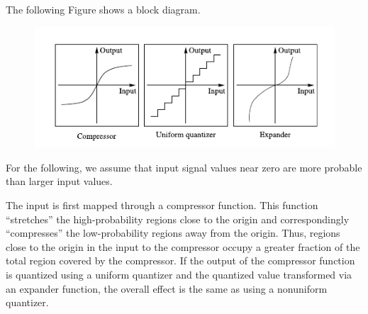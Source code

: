 The following Figure shows a block diagram.

\begin{figure}[H]
    \centering
    \includegraphics[scale=0.7]{images/2021-06-16-scalar_quant_01.png}
\end{figure}

For the following, we assume that input signal values near zero are more probable than larger input values.

The input is first mapped through a compressor function. This function “stretches” the high-probability regions close to the origin and correspondingly “compresses” the low-probability regions away from the origin. Thus, regions close to the origin in the input to the compressor occupy a greater fraction of the total region covered by the compressor. If the output of the compressor function is quantized using a uniform quantizer and the quantized value transformed via an expander function, the overall effect is the same as using a nonuniform quantizer.



